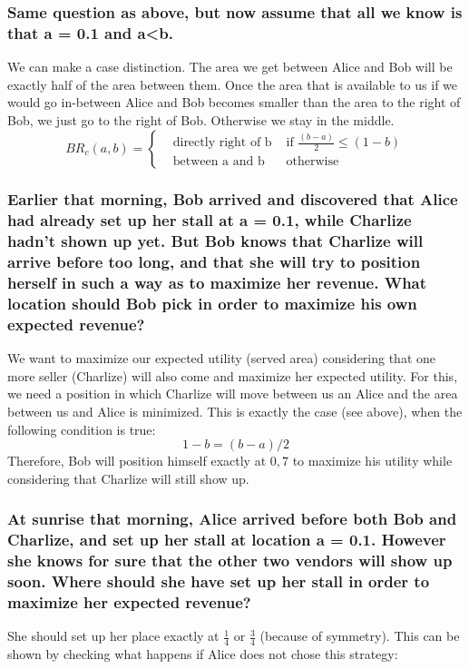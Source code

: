 \documentclass[11pt]{article}
\begin{document}
    \subsubsection{Same question as above, but now assume that all we know is that a = 0.1 and a<b.}
    We can make a case distinction. The area we get between Alice and Bob will be exactly half of the area between them.
    Once the area that is available to us if we would go in-between Alice and Bob becomes smaller than the area to the right of
    Bob, we just go to the right of Bob. Otherwise we stay in the middle.
    \begin{equation}
        BR_c(a,b)=\left\{
        \begin{array}{lll}
            & \text{directly right of b } & \mbox{if } \frac{(b-a)}{2}\leq(1-b) \\
            & \mbox{between a and b}      & \text{otherwise}
        \end{array}
        \right.
    \end{equation}

    \subsubsection{Earlier that morning, Bob arrived and discovered that Alice had already set up her stall at a = 0.1, while Charlize hadn’t shown up yet. But Bob knows that Charlize will arrive before too long, and that she will try to position herself in such a way as to maximize her revenue. What location should Bob pick in order to maximize his own expected revenue?}
    We want to maximize our expected utility (served area) considering that one more seller (Charlize) will also come and maximize
    her expected utility. For this, we need a position in which Charlize will move between us an Alice and the area between us and
    Alice is minimized. This is exactly the case (see above), when the following condition is true:
    \begin{equation}
        1-b = (b-a)/2
    \end{equation}
    Therefore, Bob will position himself exactly at $0,7$ to maximize his utility while considering that Charlize will still show up.

    \subsubsection{At sunrise that morning, Alice arrived before both Bob and Charlize, and set up her stall at location a = 0.1. However she knows for sure that the other two vendors will show up soon. Where should she have set up her stall in order to maximize her expected revenue?}
    She should set up her place exactly at $\frac{1}{4}$ or $\frac{3}{4}$ (because of symmetry). This can be shown by checking what happens
    if Alice does not chose this strategy:
\end{document}
